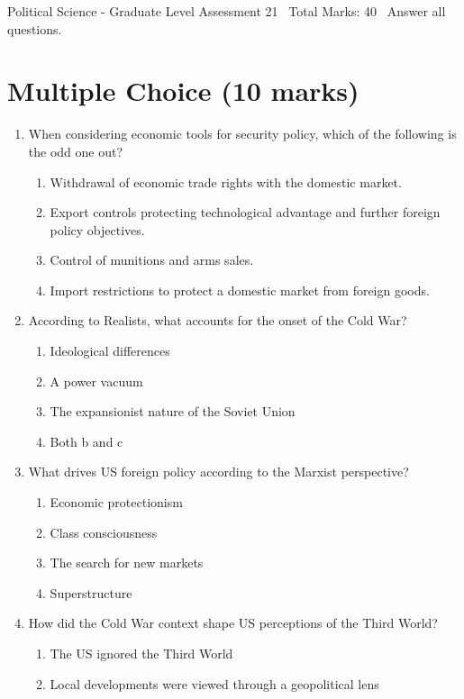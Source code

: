 \documentclass[12pt]{article}
\begin{document}
\begin{center}
Political Science - Graduate Level Assessment 21 \
Total Marks: 40 \
Answer all questions.
\end{center}

\section*{Multiple Choice (10 marks)}
\begin{enumerate}[label=\arabic*.]
\item When considering economic tools for security policy, which of the following is the odd one out?
\begin{enumerate}[label=(\alph*)]
    \item Withdrawal of economic trade rights with the domestic market.
    \item Export controls protecting technological advantage and further foreign policy objectives.
    \item Control of munitions and arms sales.
    \item Import restrictions to protect a domestic market from foreign goods.
\end{enumerate}
\item According to Realists, what accounts for the onset of the Cold War?
\begin{enumerate}[label=(\alph*)]
    \item Ideological differences
    \item A power vacuum
    \item The expansionist nature of the Soviet Union
    \item Both b and c
\end{enumerate}
\item What drives US foreign policy according to the Marxist perspective?
\begin{enumerate}[label=(\alph*)]
    \item Economic protectionism
    \item Class consciousness
    \item The search for new markets
    \item Superstructure
\end{enumerate}
\item How did the Cold War context shape US perceptions of the Third World?
\begin{enumerate}[label=(\alph*)]
    \item The US ignored the Third World
    \item Local developments were viewed through a geopolitical lens

\end{enumerate}
\end{enumerate}
\end{document}
